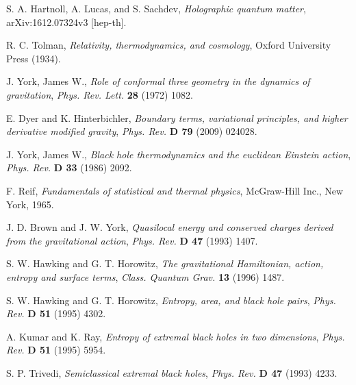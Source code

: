 \documentclass[sn-mathphys,Numbered]{sn-jnl}%
\theoremstyle{thmstyleone}%
\theoremstyle{thmstyletwo}%
\theoremstyle{thmstylethree}%
\begin{document}
\begin{thebibliography}{99}
S. A. Hartnoll, A. Lucas, and S. Sachdev, \emph{Holographic quantum  matter}, arXiv:1612.07324v3 [hep-th].

R. C. Tolman, \emph{Relativity, thermodynamics, and cosmology},
Oxford University Press (1934).

 J. York, James W., \emph{Role of conformal three geometry in the dynamics of gravitation}, \emph{Phys.
Rev. Lett.} {\bf28} (1972) 1082.

 E. Dyer and K. Hinterbichler, \emph{Boundary terms, variational principles, and higher derivative modified gravity}, \emph{Phys. Rev.} {\bf D 79} (2009) 024028.

 J. York, James W., \emph{Black hole thermodynamics and the euclidean Einstein action}, \emph{Phys. Rev.}
{\bf D 33} (1986) 2092.

 F. Reif, \emph{Fundamentals of statistical and thermal physics}, McGraw-Hill Inc., New York, 1965.

 J. D. Brown and J. W. York,  \emph{Quasilocal energy and conserved charges derived from the gravitational action}, \emph{Phys. Rev. } {\bf D 47} (1993) 1407.

S. W. Hawking and G. T. Horowitz, \emph{The gravitational Hamiltonian, action, entropy and surface
terms}, \emph{ Class. Quantum Grav.} {\bf 13} (1996) 1487.

S. W. Hawking and G. T. Horowitz, \emph{Entropy, area, and black hole pairs}, \emph{Phys. Rev. } {\bf D 51} (1995) 4302.

A. Kumar and K. Ray, \emph{Entropy of extremal black holes in two dimensions}, \emph{Phys. Rev. } {\bf D 51} (1995) 5954.

S. P. Trivedi, \emph{Semiclassical extremal black holes}, \emph{Phys. Rev.} {\bf D 47} (1993) 4233.
 

\end{thebibliography}
\end{document}

